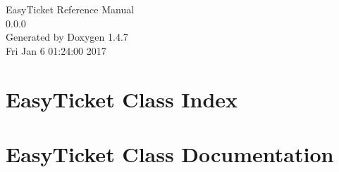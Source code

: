 \documentclass[a4paper]{book}
\begin{document}
\begin{titlepage}
\vspace*{7cm}
\begin{center}
{\Large Easy\-Ticket Reference Manual\\[1ex]\large 0.0.0 }\\
\vspace*{1cm}
{\large Generated by Doxygen 1.4.7}\\
\vspace*{0.5cm}
{\small Fri Jan 6 01:24:00 2017}\\
\end{center}
\end{titlepage}
\clearemptydoublepage
{}
\tableofcontents
\clearemptydoublepage
{}
\chapter{Easy\-Ticket Class Index}

\chapter{Easy\-Ticket Class Documentation}

\printindex
\end{document}
